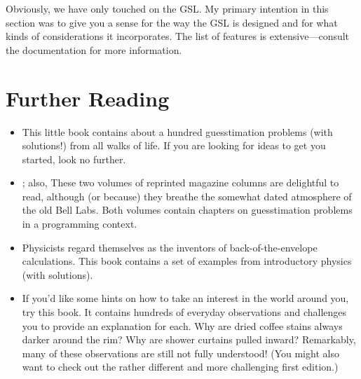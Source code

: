 Obviously, we have only touched on the GSL. My primary intention in
this section was to give you a sense for the way the GSL is designed
and for what kinds of considerations it incorporates. The list of
features is extensive---consult the documentation for more
information.


\section{Further Reading}

\begin{itemize}
\item {}
  This little book contains about a hundred guesstimation problems
  (with solutions!) from all walks of life. If you are looking for
  ideas to get you started, look no further.

\item {}; also, 
  These two volumes of reprinted magazine columns are delightful to
  read, although (or because) they breathe the somewhat dated
  atmosphere of the old Bell Labs. Both volumes contain chapters on
  guesstimation problems in a programming context.

\item {}
  Physicists regard themselves as the inventors of back-of-the-envelope
  calculations. This book contains a set of examples from introductory
  physics (with solutions).

\item {} 
  If you'd like some hints on how to take an interest in the world
  around you, try this book. It contains hundreds of everyday
  observations and challenges you to provide an explanation for each.
  Why are dried coffee stains always darker around the rim?  Why are
  shower curtains pulled inward?  Remarkably, many of these
  observations are still not fully understood! (You might also want to
  check out the rather different and more challenging first edition.)


\end{itemize}
